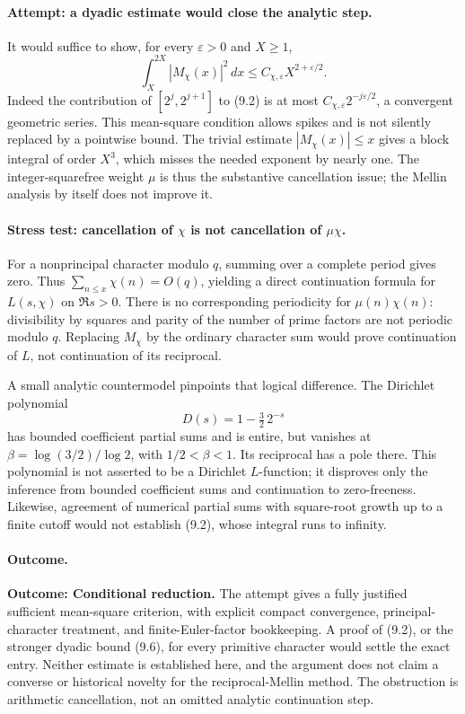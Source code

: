 \documentclass[11pt,a4paper]{article}
\begin{document}
\paragraph{Attempt: a dyadic estimate would close the analytic step.}
It would suffice to show, for every $\varepsilon>0$ and $X\geq1$,
\[
 \int_X^{2X}|M_\chi(x)|^2\,dx
       \leq C_{\chi,\varepsilon}X^{2+\varepsilon/2}. \tag{9.6}
\]
Indeed the contribution of $[2^j,2^{j+1}]$ to (9.2) is at most
$C_{\chi,\varepsilon}2^{-j\varepsilon/2}$, a convergent geometric
series. This mean-square condition allows spikes and is not silently
replaced by a pointwise bound. The trivial estimate $|M_\chi(x)|\leq x$
gives a block integral of order $X^3$, which misses the needed exponent
by nearly one. The integer-squarefree weight $\mu$ is thus the substantive
cancellation issue; the Mellin analysis by itself does not improve it.

\paragraph{Stress test: cancellation of $\chi$ is not cancellation of $\mu\chi$.}
For a nonprincipal character modulo $q$, summing over a complete period
gives zero. Thus $\sum_{n\leq x}\chi(n)=O(q)$, yielding a direct
continuation formula for $L(s,\chi)$ on $\Re s>0$. There is no corresponding
periodicity for $\mu(n)\chi(n)$: divisibility by squares and parity of
the number of prime factors are not periodic modulo $q$. Replacing
$M_\chi$ by the ordinary character sum would prove continuation of
$L$, not continuation of its reciprocal.

A small analytic countermodel pinpoints that logical difference. The
Dirichlet polynomial
\[
 D(s)=1-\tfrac32\,2^{-s}
\]
has bounded coefficient partial sums and is entire, but vanishes at
$\beta=\log(3/2)/\log2$, with $1/2<\beta<1$. Its reciprocal has a pole
there. This polynomial is not asserted to be a Dirichlet $L$-function;
it disproves only the inference from bounded coefficient sums and
continuation to zero-freeness. Likewise, agreement of numerical partial
sums with square-root growth up to a finite cutoff would not establish
(9.2), whose integral runs to infinity.

\paragraph{Outcome.}
\textbf{Outcome: Conditional reduction.}
The attempt gives a fully justified sufficient mean-square criterion,
with explicit compact convergence, principal-character treatment, and
finite-Euler-factor bookkeeping. A proof of (9.2), or the stronger
dyadic bound (9.6), for every primitive character would settle the exact
entry. Neither estimate is established here, and the argument does not
claim a converse or historical novelty for the reciprocal-Mellin method.
The obstruction is arithmetic cancellation, not an omitted analytic
continuation step.
\end{document}
